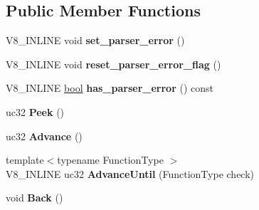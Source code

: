 \subsection*{Public Member Functions}
\begin{DoxyCompactItemize}
\item 
\mbox{\label{classv8_1_1internal_1_1Utf16CharacterStream_a3bd84c7da052db51a5cf26e6356a6e11}} 
V8\+\_\+\+I\+N\+L\+I\+NE void {\bfseries set\+\_\+parser\+\_\+error} ()
\item 
\mbox{\label{classv8_1_1internal_1_1Utf16CharacterStream_a5301fbc1f6cbd82c6fbb9dc91b3fd5c2}} 
V8\+\_\+\+I\+N\+L\+I\+NE void {\bfseries reset\+\_\+parser\+\_\+error\+\_\+flag} ()
\item 
\mbox{\label{classv8_1_1internal_1_1Utf16CharacterStream_a3a226b0b173c5ee046ea8f2f12184b3c}} 
V8\+\_\+\+I\+N\+L\+I\+NE \mbox{\hyperlink{classbool}{bool}} {\bfseries has\+\_\+parser\+\_\+error} () const
\item 
\mbox{\label{classv8_1_1internal_1_1Utf16CharacterStream_ad5e7aea844336ef2d23fec2f73bfee3c}} 
uc32 {\bfseries Peek} ()
\item 
\mbox{\label{classv8_1_1internal_1_1Utf16CharacterStream_a411192b2cf2212fcc3a1167a46906b79}} 
uc32 {\bfseries Advance} ()
\item 
\mbox{\label{classv8_1_1internal_1_1Utf16CharacterStream_aff3c06034d6a83d9584cde81ab6a7ce8}} 
{\footnotesize template$<$typename Function\+Type $>$ }\\V8\+\_\+\+I\+N\+L\+I\+NE uc32 {\bfseries Advance\+Until} (Function\+Type check)
\item 
\mbox{\label{classv8_1_1internal_1_1Utf16CharacterStream_a219b5bfb5eb991c21874ff4efcdd34f3}} 
void {\bfseries Back} ()
\item 
\mbox{\label{classv8_1_1internal_1_1Utf16CharacterStream_a05e023ae96736d07fd7f89305a0213c6}} 

\end{DoxyCompactItemize}
